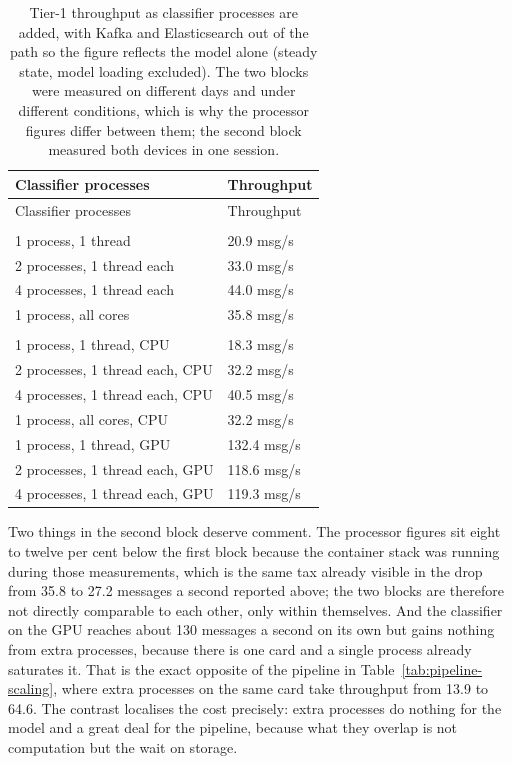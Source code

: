 \begin{longtable}{@{}ll@{}}
\caption{Tier-1 throughput as classifier processes are added, with Kafka and Elasticsearch out of the path so the figure reflects the model alone (steady state, model loading excluded). The two blocks were measured on different days and under different conditions, which is why the processor figures differ between them; the second block measured both devices in one session.}\label{tab:scaling}\tabularnewline
\toprule
Classifier processes & Throughput \\
\midrule
\endfirsthead
\toprule
Classifier processes & Throughput \\
\midrule
\endhead
\bottomrule
\endlastfoot
\multicolumn{2}{@{}l}{\emph{on the processor, container stack down}} \\
1 process, 1 thread & 20.9 msg/s \\
2 processes, 1 thread each & 33.0 msg/s \\
4 processes, 1 thread each & 44.0 msg/s \\
1 process, all cores & 35.8 msg/s \\
\addlinespace[0.5em]
\multicolumn{2}{@{}l}{\emph{both devices in one session, container stack up}} \\
1 process, 1 thread, CPU & 18.3 msg/s \\
2 processes, 1 thread each, CPU & 32.2 msg/s \\
4 processes, 1 thread each, CPU & 40.5 msg/s \\
1 process, all cores, CPU & 32.2 msg/s \\
1 process, 1 thread, GPU & 132.4 msg/s \\
2 processes, 1 thread each, GPU & 118.6 msg/s \\
4 processes, 1 thread each, GPU & 119.3 msg/s \\
\end{longtable}

Two things in the second block deserve comment. The processor figures sit eight to twelve per cent below the first block because the container stack was running during those measurements, which is the same tax already visible in the drop from 35.8 to 27.2 messages a second reported above; the two blocks are therefore not directly comparable to each other, only within themselves. And the classifier on the GPU reaches about 130 messages a second on its own but gains nothing from extra processes, because there is one card and a single process already saturates it. That is the exact opposite of the pipeline in Table~\ref{tab:pipeline-scaling}, where extra processes on the same card take throughput from 13.9 to 64.6. The contrast localises the cost precisely: extra processes do nothing for the model and a great deal for the pipeline, because what they overlap is not computation but the wait on storage.


